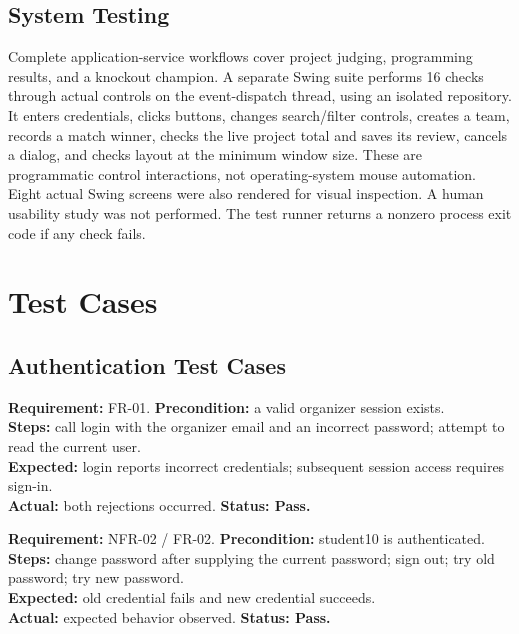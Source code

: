 \subsection{System Testing}
Complete application-service workflows cover project judging, programming results, and a knockout champion. A separate Swing suite performs 16 checks through actual controls on the event-dispatch thread, using an isolated repository. It enters credentials, clicks buttons, changes search/filter controls, creates a team, records a match winner, checks the live project total and saves its review, cancels a dialog, and checks layout at the minimum window size. These are programmatic control interactions, not operating-system mouse automation. Eight actual Swing screens were also rendered for visual inspection. A human usability study was not performed. The test runner returns a nonzero process exit code if any check fails.

\clearpage\section{Test Cases}
\subsection{Authentication Test Cases}
\begin{contentbox}
\textbf{Requirement:} FR-01. \textbf{Precondition:} a valid organizer session exists.\\
\textbf{Steps:} call login with the organizer email and an incorrect password; attempt to read the current user.\\
\textbf{Expected:} login reports incorrect credentials; subsequent session access requires sign-in.\\
\textbf{Actual:} both rejections occurred. \textbf{Status: Pass.}
\end{contentbox}
\begin{contentbox}
\textbf{Requirement:} NFR-02 / FR-02. \textbf{Precondition:} student10 is authenticated.\\
\textbf{Steps:} change password after supplying the current password; sign out; try old password; try new password.\\
\textbf{Expected:} old credential fails and new credential succeeds.\\
\textbf{Actual:} expected behavior observed. \textbf{Status: Pass.}
\end{contentbox}
